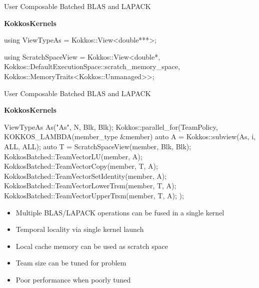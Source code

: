 \begin{frame}[fragile]{User Composable Batched BLAS and LAPACK}

  \textbf{KokkosKernels} \\
  \vspace{10pt}
    \begin{code}[keywords={parallel_for,auto,const,double}]
      using ViewTypeAs = Kokkos::View<double***>;


      using ScratchSpaceView = Kokkos::View<double*,
        Kokkos::DefaultExecutionSpace::scratch_memory_space,
        Kokkos::MemoryTraits<Kokkos::Unmanaged>>;
    \end{code}
  \end{frame}
  \begin{frame}[fragile]{User Composable Batched BLAS and LAPACK}

  \textbf{KokkosKernels} \\
    \begin{code}[keywords={parallel_for,auto,const,double}]
      ViewTypeAs As("As", N, Blk, Blk);
      Kokkos::parallel_for(TeamPolicy,
        KOKKOS_LAMBDA(member_type &member) {
          auto A = Kokkos::subview(As, i, ALL, ALL);
          auto T = ScratchSpaceView(member, Blk, Blk);
          KokkosBatched::TeamVectorLU(member, A);
          KokkosBatched::TeamVectorCopy(member, T, A);
          KokkosBatched::TeamVectorSetIdentity(member, A);
          KokkosBatched::TeamVectorLowerTrsm(member, T, A);
          KokkosBatched::TeamVectorUpperTrsm(member, T, A);
      });
    \end{code}
    \begin{itemize}
      \item \small{Multiple BLAS/LAPACK operations can be fused in a single kernel}
      \item \small{Temporal locality via single kernel launch}
      \item \small{Local cache memory can be used as scratch space}
      \item \small{Team size can be tuned for problem}
      \item \small{Poor performance when poorly tuned}
    \end{itemize}
\end{frame}

